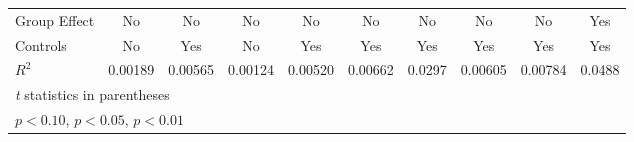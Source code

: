 {\begin{tabular}{l*{9}{c}}
Group Effect    &       No         &       No         &       No         &       No         &       No         &       No         &       No         &       No         &      Yes         \\
Controls        &       No         &      Yes         &       No         &      Yes         &      Yes         &      Yes         &      Yes         &      Yes         &      Yes         \\
$ R^2 $         &  0.00189         &  0.00565         &  0.00124         &  0.00520         &  0.00662         &   0.0297         &  0.00605         &  0.00784         &   0.0488         \\
\hline\hline
\multicolumn{10}{l}{\footnotesize \textit{t} statistics in parentheses}\\
\multicolumn{10}{l}{\footnotesize \sym{*} \(p<0.10\), \sym{**} \(p<0.05\), \sym{***} \(p<0.01\)}\\
\end{tabular}
}
